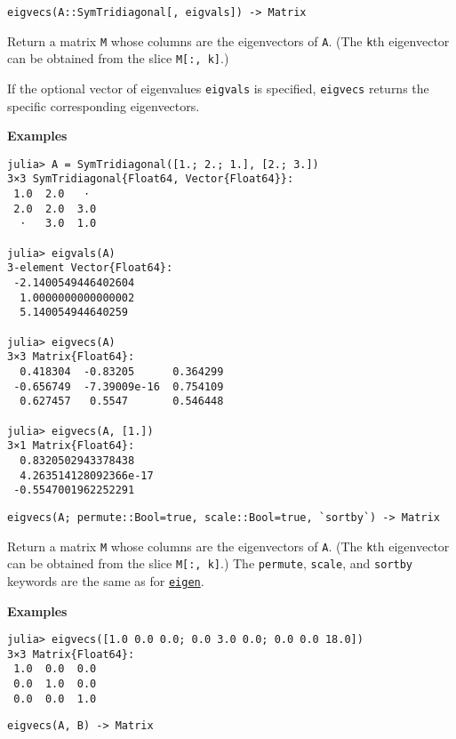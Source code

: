 \begin{adjustwidth}{2em}{0pt}


\begin{verbatim}
eigvecs(A::SymTridiagonal[, eigvals]) -> Matrix
\end{verbatim}

Return a matrix \texttt{M} whose columns are the eigenvectors of \texttt{A}. (The \texttt{k}th eigenvector can be obtained from the slice \texttt{M[:, k]}.)

If the optional vector of eigenvalues \texttt{eigvals} is specified, \texttt{eigvecs} returns the specific corresponding eigenvectors.

\textbf{Examples}


\begin{verbatim}
julia> A = SymTridiagonal([1.; 2.; 1.], [2.; 3.])
3×3 SymTridiagonal{Float64, Vector{Float64}}:
 1.0  2.0   ⋅
 2.0  2.0  3.0
  ⋅   3.0  1.0

julia> eigvals(A)
3-element Vector{Float64}:
 -2.1400549446402604
  1.0000000000000002
  5.140054944640259

julia> eigvecs(A)
3×3 Matrix{Float64}:
  0.418304  -0.83205      0.364299
 -0.656749  -7.39009e-16  0.754109
  0.627457   0.5547       0.546448

julia> eigvecs(A, [1.])
3×1 Matrix{Float64}:
  0.8320502943378438
  4.263514128092366e-17
 -0.5547001962252291
\end{verbatim}




\begin{lstlisting}
eigvecs(A; permute::Bool=true, scale::Bool=true, `sortby`) -> Matrix
\end{lstlisting}

Return a matrix \texttt{M} whose columns are the eigenvectors of \texttt{A}. (The \texttt{k}th eigenvector can be obtained from the slice \texttt{M[:, k]}.) The \texttt{permute}, \texttt{scale}, and \texttt{sortby} keywords are the same as for \hyperlink{11056016707394839114}{\texttt{eigen}}.

\textbf{Examples}


\begin{verbatim}
julia> eigvecs([1.0 0.0 0.0; 0.0 3.0 0.0; 0.0 0.0 18.0])
3×3 Matrix{Float64}:
 1.0  0.0  0.0
 0.0  1.0  0.0
 0.0  0.0  1.0
\end{verbatim}




\begin{lstlisting}
eigvecs(A, B) -> Matrix
\end{lstlisting}


\end{adjustwidth}
